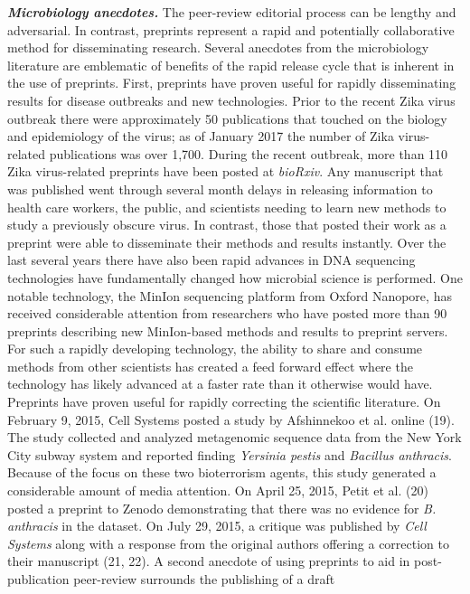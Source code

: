 \documentclass[11pt,]{article}
\begin{document}
\textbf{\emph{Microbiology anecdotes.}} The peer-review editorial
process can be lengthy and adversarial. In contrast, preprints represent
a rapid and potentially collaborative method for disseminating research.
Several anecdotes from the microbiology literature are emblematic of
benefits of the rapid release cycle that is inherent in the use of
preprints. First, preprints have proven useful for rapidly disseminating
results for disease outbreaks and new technologies. Prior to the recent
Zika virus outbreak there were approximately 50 publications that
touched on the biology and epidemiology of the virus; as of January 2017
the number of Zika virus-related publications was over 1,700. During the
recent outbreak, more than 110 Zika virus-related preprints have been
posted at \emph{bioRxiv}. Any manuscript that was published went through
several month delays in releasing information to health care workers,
the public, and scientists needing to learn new methods to study a
previously obscure virus. In contrast, those that posted their work as a
preprint were able to disseminate their methods and results instantly.
Over the last several years there have also been rapid advances in DNA
sequencing technologies have fundamentally changed how microbial science
is performed. One notable technology, the MinIon sequencing platform
from Oxford Nanopore, has received considerable attention from
researchers who have posted more than 90 preprints describing new
MinIon-based methods and results to preprint servers. For such a rapidly
developing technology, the ability to share and consume methods from
other scientists has created a feed forward effect where the technology
has likely advanced at a faster rate than it otherwise would have.
Preprints have proven useful for rapidly correcting the scientific
literature. On February 9, 2015, Cell Systems posted a study by
Afshinnekoo et al. online (19). The study collected and analyzed
metagenomic sequence data from the New York City subway system and
reported finding \emph{Yersinia pestis} and \emph{Bacillus anthracis}.
Because of the focus on these two bioterrorism agents, this study
generated a considerable amount of media attention. On April 25, 2015,
Petit et al. (20) posted a preprint to Zenodo demonstrating that there
was no evidence for \emph{B. anthracis} in the dataset. On July 29,
2015, a critique was published by \emph{Cell Systems} along with a
response from the original authors offering a correction to their
manuscript (21, 22). A second anecdote of using preprints to aid in
post-publication peer-review surrounds the publishing of a draft
\end{document}
